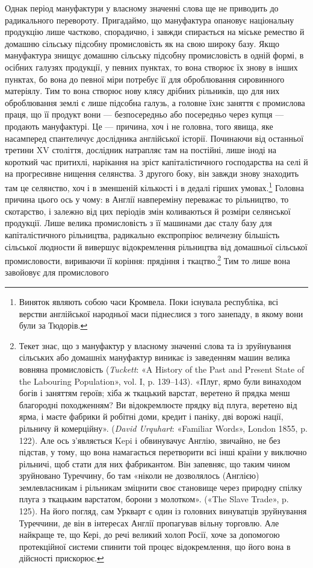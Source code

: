 Однак період мануфактури у власному значенні слова ще не
приводить до радикального перевороту. Пригадаймо, що мануфактура
опановує національну продукцію лише частково, спорадично,
і завжди спирається на міське ремество й домашню
сільську підсобну промисловість як на свою широку базу.
Якщо мануфактура знищує домашню сільську підсобну промисловість
в одній формі, в осібних галузях продукції, у певних
пунктах, то вона створює їх знову в інших пунктах, бо вона до
певної міри потребує її для оброблювання сировинного матеріялу.
Тим то вона створює нову клясу дрібних рільників, що для них
оброблювання землі є лише підсобна галузь, а головне їхнє заняття
є промислова праця, що її продукт вони — безпосередньо
або посередньо через купця — продають мануфактурі. Це —
причина, хоч і не головна, того явища, яке насамперед спантеличує
дослідника англійської історії. Починаючи від останньої
третини XV століття, дослідник натрапляє там на постійні,
лише іноді на короткий час притихлі, нарікання на зріст капіталістичного
господарства на селі й на прогресивне нищення
селянства. З другого боку, він завжди знову знаходить там це
селянство, хоч і в зменшеній кількості і в дедалі гірших умовах.\footnote{
Виняток являють собою часи Кромвела. Поки існувала республіка,
всі верстви англійської народньої маси піднеслися з того занепаду,
в якому вони були за Тюдорів.
}
Головна причина цього ось у чому: в Англії навпереміну переважає
то рільництво, то скотарство, і залежно від цих періодів
змін коливаються й розміри селянської продукції. Лише велика
промисловість з її машинами дає сталу базу для капіталістичного
рільництва, радикально експропріює величезну більшість сільської
людности й вивершує відокремлення рільництва від домашньої
сільської промисловости, вириваючи її коріння: прядіння
і ткацтво.\footnote{
Текет знає, що з мануфактур у власному значенні слова та із
зруйнування сільських або домашніх мануфактур виникає із заведенням
машин велика вовняна промисловість (\emph{Tuckett}: «A History of the Past
and Present State of the Labouring Population», vol. I, p. 139--143).
«Плуг, ярмо були винаходом богів і заняттям героїв; хіба ж ткацький
варстат, веретено й прядка менш благородні походженням? Ви відокремлюєте
прядку від плуга, веретено від ярма, і маєте фабрики й робітні
доми, кредит і паніку, дві ворожі нації, рільничу й комерційну».
(\emph{David Urquhart}: «Familiar Words», London 1855, p. 122). Але ось з’являється
Kepi і обвинувачує Англію, звичайно, не без підстав, у тому,
що вона намагається перетворити всі інші країни у виключно рільничі,
щоб стати для них фабрикантом. Він запевняє, що таким чином зруйновано
Туреччину, бо там «ніколи не дозволялось (Англією) землевласникам
і рільникам зміцнити своє становище через природну спілку плуга
з ткацьким варстатом, борони з молотком». («The Slave Trade», p. 125).
На його погляд, сам Уркварт є один із головних винуватців зруйнування
Туреччини, де він в інтересах Англії пропагував вільну торговлю.
Але найкраще те, що Кері, до речі великий холоп Росії, хоче за допомогою
протекційної системи спинити той процес відокремлення, що його вона
в дійсності прискорює.
} Тим то лише вона завойовує для промислового
